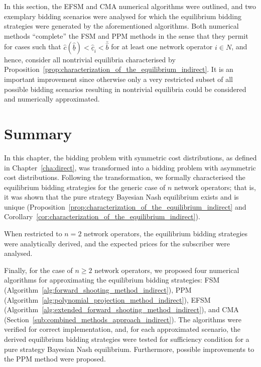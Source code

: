 In this section, the EFSM and CMA numerical algorithms were outlined, and two exemplary bidding scenarios were analysed for which the equilibrium bidding strategies were generated by the aforementioned algorithms. Both numerical methods ``complete'' the FSM and PPM methods in the sense that they permit for cases such that $\hat{c}(\underline{\hat{b}}) < \underline{\hat{c}}_i < \bar{\hat{b}}$ for at least one network operator $i\in N$, and hence, consider all nontrivial equilibria characterised by Proposition~\ref{prop:characterization_of_the_equilibrium_indirect}. It is an important improvement since otherwise only a very restricted subset of all possible bidding scenarios resulting in nontrivial equilibria could be considered and numerically approximated.

\section{Summary}
\label{sec:summary_indirect}
In this chapter, the bidding problem with symmetric cost distributions, as defined in Chapter~\ref{cha:direct}, was transformed into a bidding problem with asymmetric cost distributions. Following the transformation, we formally characterised the equilibrium bidding strategies for the generic case of $n$ network operators; that is, it was shown that the pure strategy Bayesian Nash equilibrium exists and is unique (Proposition~\ref{prop:characterization_of_the_equilibrium_indirect} and Corollary~\ref{cor:characterization_of_the_equilibrium_indirect}).

When restricted to $n=2$ network operators, the equilibrium bidding strategies were analytically derived, and the expected prices for the subscriber were analysed.

Finally, for the case of $n\geq 2$ network operators, we proposed four numerical algorithms for approximating the equilibrium bidding strategies: FSM (Algorithm~\ref{alg:forward_shooting_method_indirect}), PPM (Algorithm~\ref{alg:polynomial_projection_method_indirect}), EFSM (Algorithm~\ref{alg:extended_forward_shooting_method_indirect}), and CMA (Section~\ref{sub:combined_methods_approach_indirect}). The algorithms were verified for correct implementation, and, for each approximated scenario, the derived equilibrium bidding strategies were tested for sufficiency condition for a pure strategy Bayesian Nash equilibrium. Furthermore, possible improvements to the PPM method were proposed.

